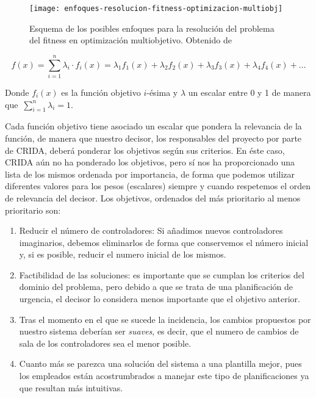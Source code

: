 \begin{figure}
	\centering
	\texttt{[image: enfoques-resolucion-fitness-optimizacion-multiobj]}
	\caption[Esquema de los posibles enfoques para la resolución del problema del fitness en optimización multiobjetivo]{Esquema de los posibles enfoques para la resolución del problema del fitness en optimización multiobjetivo. Obtenido de~\cite{sota:metaheuristicas-design-impl}}
	\label{fig:enfoques-fitness-multiobj}
\end{figure}

\[
	f(x) = \sum_{i=1}^{n} \lambda_i \cdot f_i(x) = \lambda_1 f_1(x) + \lambda_2 f_2(x) + \lambda_3 f_3(x) + \lambda_4 f_4(x) + \dots
\]

Donde $f_i(x)$ es la función objetivo $i$-ésima y $\lambda$ un escalar entre 0 y 1 de manera que~$\sum_{i=1}^n \lambda_i = 1$.

Cada función objetivo tiene asociado un escalar que pondera la relevancia de la función, de manera que nuestro decisor, los responsables del proyecto por parte de \gls{CRIDA}, deberá ponderar los objetivos según sus criterios. En éste caso, CRIDA aún no ha ponderado los objetivos, pero sí nos ha proporcionado una lista de los mismos ordenada por importancia, de forma que podemos utilizar diferentes valores para los pesos (escalares) siempre y cuando respetemos el orden de relevancia del decisor. Los objetivos, ordenados del más prioritario al menos prioritario son:

\begin{enumerate}[label={O\arabic*}]
	\item \label{O1} Reducir el número de controladores: Si añadimos nuevos controladores imaginarios, debemos eliminarlos de forma que conservemos el número inicial y, si es posible, reducir el numero inicial de los mismos.
	
	\item \label{O2} Factibilidad de las soluciones: es importante que se cumplan los criterios del dominio del problema, pero debido a que se trata de una planificación de urgencia, el decisor lo considera menos importante que el objetivo anterior.
	
	\item \label{O3} Tras el momento en el que se sucede la incidencia, los cambios propuestos por nuestro sistema deberían ser \textit{suaves}, es decir, que el numero de cambios de sala de los controladores sea el menor posible.
	
	\item \label{O4} Cuanto más se parezca una solución del sistema a una plantilla mejor, pues los empleados están acostrumbrados a manejar este tipo de planificaciones ya que resultan más intuitivas.
\end{enumerate}

